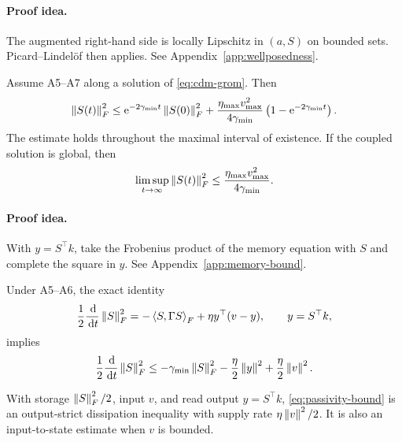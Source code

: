 \paragraph{Proof idea.}
The augmented right-hand side is locally Lipschitz in $(a,S)$ on bounded
sets. Picard--Lindel\"of then applies. See Appendix~\ref{app:wellposedness}.

\label{thm:memory-boundedness}
\begin{theoremthree}
Assume A5--A7 along a solution of \eqref{eq:cdm-grom}. Then
\begin{equation}
 \left\lVert S(t)\right\rVert_F^2
 \le
 \mathrm{e}^{-2\gamma_{\min}t}\left\lVert S(0)\right\rVert_F^2+
 \frac{\eta_{\max}v_{\max}^2}{4\gamma_{\min}}
 \left(1-\mathrm{e}^{-2\gamma_{\min}t}\right).
 \label{eq:memory-explicit-bound}
\end{equation}
The estimate holds throughout the maximal interval of existence. If the
coupled solution is global, then
\begin{equation}
 \limsup_{t\to\infty}\left\lVert S(t)\right\rVert_F^2
 \le\frac{\eta_{\max}v_{\max}^2}{4\gamma_{\min}}.
 \label{eq:memory-limsup}
\end{equation}
\end{theoremthree}

\paragraph{Proof idea.}
With $y=S^\top k$, take the Frobenius product of the memory equation with
$S$ and complete the square in $y$. See Appendix~\ref{app:memory-bound}.

\label{prop:memory-passivity}
\begin{propositiontwo}
Under A5--A6, the exact identity
\begin{equation}
 \frac12\frac{\,\mathrm{d}}{\,\mathrm{d} t}\left\lVert S\right\rVert_F^2
 =-\left\langle S,\Gamma S\right\rangle_F+\eta y^\top(v-y),
 \qquad y=S^\top k,
 \label{eq:memory-energy-identity}
\end{equation}
implies
\begin{equation}
 \frac12\frac{\,\mathrm{d}}{\,\mathrm{d} t}\left\lVert S\right\rVert_F^2
 \le
 -\gamma_{\min}\left\lVert S\right\rVert_F^2
 -\frac{\eta}{2}\left\lVert y\right\rVert^2
 +\frac{\eta}{2}\left\lVert v\right\rVert^2.
 \label{eq:passivity-bound}
\end{equation}
\end{propositiontwo}

\begin{remark}
With storage $\left\lVert S\right\rVert_F^2/2$, input $v$, and read output $y=S^\top k$,
\eqref{eq:passivity-bound} is an output-strict dissipation inequality with
supply rate $\eta\left\lVert v\right\rVert^2/2$. It is also an input-to-state estimate when
$v$ is bounded.
\end{remark}

